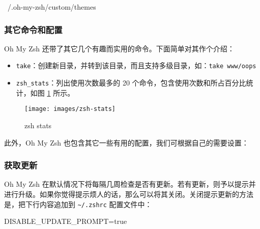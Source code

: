 \documentclass[]{ctexbook}
\newenvironment{Shaded}{\begin{snugshade}}{\end{snugshade}}
\newcommand{\CommentTok}[1]{\textcolor[rgb]{0.56,0.35,0.01}{\textit{#1}}}
\newcommand{\ExtensionTok}[1]{#1}
\newcommand{\NormalTok}[1]{#1}
\newcommand{\StringTok}[1]{\textcolor[rgb]{0.31,0.60,0.02}{#1}}
\newcommand{\VariableTok}[1]{\textcolor[rgb]{0.00,0.00,0.00}{#1}}
\providecommand{\tightlist}{%
  \setlength{\itemsep}{0pt}\setlength{\parskip}{0pt}}
\begin{document}
\begin{Shaded}
\begin{Highlighting}[]
\ExtensionTok{~/.oh-my-zsh/custom/themes}
\end{Highlighting}
\end{Shaded}

\hypertarget{ux5176ux5b83ux547dux4ee4ux548cux914dux7f6e}{%
\subsubsection{其它命令和配置}\label{ux5176ux5b83ux547dux4ee4ux548cux914dux7f6e}}

Oh My Zsh 还带了其它几个有趣而实用的命令。下面简单对其作个介绍：

\begin{itemize}
\tightlist
\item
  \texttt{take}：创建新目录，并转到该目录，而且支持多级目录，如：\texttt{take\ www/oops}
\item
  \texttt{zsh\_stats}：列出使用次数最多的 20 个命令，包含使用次数和所占百分比统计，如图 \ref{fig:zsh-stats} 所示。
\end{itemize}

\begin{figure}
\texttt{[image: images/zsh-stats]} \caption{zsh stats}\label{fig:zsh-stats}
\end{figure}

此外，Oh My Zsh 也包含其它一些有用的配置，我们可根据自己的需要设置：

\begin{Shaded}
\end{Shaded}

\hypertarget{ux83b7ux53d6ux66f4ux65b0}{%
\subsubsection{获取更新}\label{ux83b7ux53d6ux66f4ux65b0}}

Oh My Zsh 在默认情况下将每隔几周检查是否有更新。若有更新，则予以提示并进行升级。如果你觉得提示烦人的话，那么可以将其关闭。关闭提示更新的方法是，把下行内容追加到 \texttt{\textasciitilde{}/.zshrc} 配置文件中：

\begin{Shaded}
\begin{Highlighting}[]
\VariableTok{DISABLE_UPDATE_PROMPT=}\NormalTok{true}
\end{Highlighting}
\end{Shaded}
\end{document}
